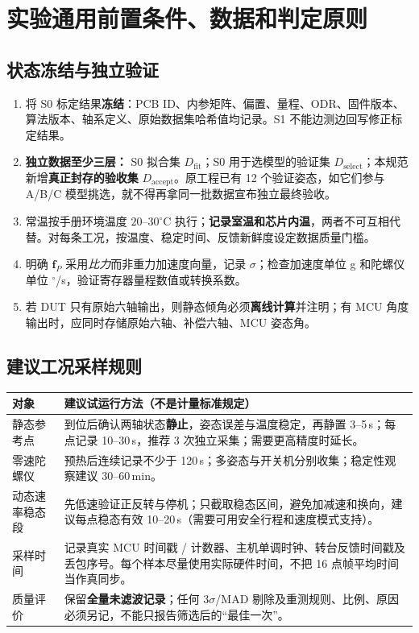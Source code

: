 \chapter{实验通用前置条件、数据和判定原则}
\section{状态冻结与独立验证}
\begin{enumerate}
\item 将 S0 标定结果\textbf{冻结}：PCB ID、内参矩阵、偏置、量程、ODR、固件版本、算法版本、轴系定义、原始数据集哈希值均记录。S1 不能边测边回写修正标定结果。
\item \textbf{独立数据至少三层：} S0 拟合集 $D_\mathrm{fit}$；S0 用于选模型的验证集 $D_\mathrm{select}$；本规范新增\textbf{真正封存的验收集} $D_\mathrm{accept}$。原工程已有 12 个验证姿态，如它们参与 A/B/C 模型挑选，就不得再拿同一批数据宣布独立最终验收。
\item 常温按手册环境温度 $20$--$30^\circ\mathrm C$ 执行；\textbf{记录室温和芯片内温}，两者不可互相代替。对每条工况，按温度、稳定时间、反馈新鲜度设定数据质量门槛。
\item 明确 $\mathbf f_P$ 采用\emph{比力}而非重力加速度向量，记录 $\sigma$；检查加速度单位 g 和陀螺仪单位 $^\circ$/s，验证寄存器量程数值或转换系数。
\item 若 DUT 只有原始六轴输出，则静态倾角必须\textbf{离线计算}并注明；有 MCU 角度输出时，应同时存储原始六轴、补偿六轴、MCU 姿态角。
\end{enumerate}
\section{建议工况采样规则}
\noindent\begin{tabularx}{\textwidth}{p{51mm}Y}
\toprule
对象 & 建议试运行方法（不是计量标准规定）\\\midrule
静态参考点 & 到位后确认两轴状态\textbf{静止}，姿态误差与温度稳定，再静置 3--5\,s；每点记录 10--30\,s，推荐 3 次独立采集；需要更高精度时延长。\\
零速陀螺仪 & 预热后连续记录不少于 120\,s；多姿态与开关机分别收集；稳定性观察建议 30--60\,min。\\
动态速率稳态段 & 先低速验证正反转与停机；只截取稳态区间，避免加减速和换向，建议每点稳态有效 10--20\,s（需要可用安全行程和速度模式支持）。\\
采样时间 & 记录真实 MCU 时间戳 / 计数器、主机单调时钟、转台反馈时间戳及丢包序号。每个样本尽量使用实际硬件时间，不把 16 点帧平均时间当作真同步。\\
质量评价 & 保留\textbf{全量未滤波记录}；任何 3$\sigma$/MAD 剔除及重测规则、比例、原因必须另记，不能只报告筛选后的“最佳一次”。\\\bottomrule
\end{tabularx}

